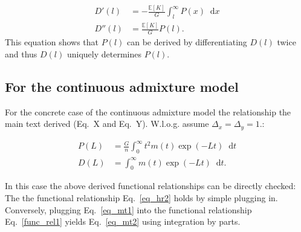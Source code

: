 \documentclass[11pt]{article}
\newcommand*\diff{\mathop{}\!\mathrm{d}}
\begin{document}
\begin{align}
D'(l) &= -\frac{\mathbb{E}[K]}{G} \int_l^\infty P(x) \diff x \\
D''(l) &= \frac{\mathbb{E}[K]}{G} P(l). \label{eq_hr2}
\end{align}
This equation shows that $P(l)$ can be derived by differentiating $D(l)$ twice and thus $D(l)$ uniquely determines $P(l)$.

\subsection{For the continuous admixture model}
For the concrete case of the continuous admixture model the relationship the main text derived (Eq.~X and Eq.~Y). W.l.o.g. assume $\Delta_x = \Delta_y = 1$.:

\begin{align}
P(L) &= \frac{G}{n}\int_{0}^{\infty} t^2 m(t) \exp(-Lt) \diff t \label{eq_mt1} \\
    D(L) &= \int_0^{\infty} m(t)\exp(-Lt) \diff t \text{.} \label{eq_mt2}
\end{align}

 In this case the above derived functional relationships can be directly checked:  The the functional relationship Eq.~\ref{eq_hr2} holds by simple plugging in. Conversely, plugging Eq.~\ref{eq_mt1} into the functional relationship Eq.~\ref{func_rel1} yields Eq.~\ref{eq_mt2} using integration by parts.
\end{document}
